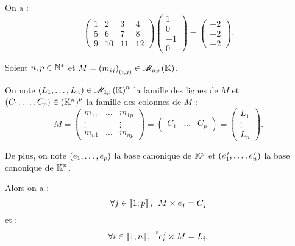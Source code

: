 \begin{ex}
On a : \[\begin{pmatrix}
1 & 2 & 3 & 4 \\
5 & 6 & 7 & 8 \\
9 & 10 & 11 & 12
\end{pmatrix}\begin{pmatrix}
1 \\
0 \\
-1 \\
0
\end{pmatrix}=\begin{pmatrix}
-2 \\
-2 \\
-2
\end{pmatrix}.\]
\end{ex}

\begin{cor}
Soient \(n,p\in\mathbb{N}^*\) et \(M=\paren{m_{ij}}_{\paren{i,j}}\in\M{np}\).

On note \(\paren{L_1,\dots,L_n}\in\M{1p}^n\) la famille des lignes de \(M\) et \(\left(C_1,\dots,C_p\right)\in\left(\mathbb{K}^n\right)^p\) la famille des colonnes de \(M\) : \[M=\begin{pmatrix}
m_{11} & \dots & m_{1p} \\
\vdots &  & \vdots \\
m_{n1} & \dots & m_{np}
\end{pmatrix}=\begin{pmatrix}
C_1 & \dots & C_p
\end{pmatrix}=\begin{pmatrix}
L_1 \\
\vdots \\
L_n
\end{pmatrix}.\]

De plus, on note \(\left(e_1,\dots,e_p\right)\) la base canonique de \(\mathbb{K}^p\) et \(\left(e_1^{\,\prime},\dots,e_n^{\,\prime}\right)\) la base canonique de \(\mathbb{K}^n\).

Alors on a : \[\quantifs{\forall j\in\interventierii{1}{p}}M\times e_j=C_j\] et : \[\quantifs{\forall i\in\interventierii{1}{n}}\trans{e_i\prim}\times M=L_i.\]
\end{cor}

